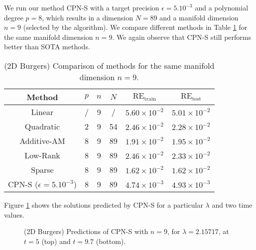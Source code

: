 We run our method CPN-S with a target precision $\epsilon =5.10^{-3}$ and  a polynomial degree $p=8$, which results in a dimension $N = 89$ and a manifold dimension $ n= 9$ (selected by the algorithm).
We  compare  different  methods  in  Table  \ref{tab:burgers_comparison_table}  for  the same manifold dimension $n= 9$.  
We again observe that CPN-S still performs better than SOTA methods.


\begin{table}[h]
\centering %

\begin{tabular}{|c|c|c|c|c|c|}
\hline
 Method & $p$  & $n$ & $N$ & $ \text{RE}_{\text{train}} $ & $ \text{RE}_{\text{test}} $ \\ 
 \hline
 Linear & / &  9  & / & $5.60 \times 10^{-2}$  & $5.01 \times 10^{-2}$ \\ 
 \hline
 Quadratic &  2 & 9 & 54 & $ 2.46 \times 10^{-2}$  & $ 2.28 \times 10^{-2}$  \\ 
 \hline
Additive-AM & 8 & 9 & 89 & $ 1.91 \times 10^{-2}$  & $ 1.95 \times 10^{-2} $  \\
 \hline
  Low-Rank & 8 & 9 & 89 & $2.46\times 10^{-2}$ & $2.33 \times 10^{-2}$ \\
 \hline
 Sparse &  8 & 9 & 89 & $ 1.62 \times 10^{-2} $  & $ 1.62 \times 10^{-2} $  \\
 \hline
 CPN-S ($\epsilon = 5.10^{-3}$) &  8 & 9 & 89 & $ 4.74 \times 10^{-3} $ & $ 4.93 \times 10^{-3} $ \\ 
 \hline
\end{tabular}
\caption{(2D Burgers) Comparison of methods for the same manifold dimension $ n = 9 $.}
\label{tab:burgers_comparison_table}
\end{table}

Figure \ref{fig:burgers_viz_solution} shows the  solutions predicted by CPN-S for a particular $\lambda$ and two time values.

\begin{figure}[h!]
    \centering
    \caption{(2D Burgers) Predictions of CPN-S with $ n = 9 $, for $\lambda = 2.15717$, at $t=5$ (top) and $t=9.7$ (bottom).}
    \label{fig:burgers_viz_solution}
\end{figure}

